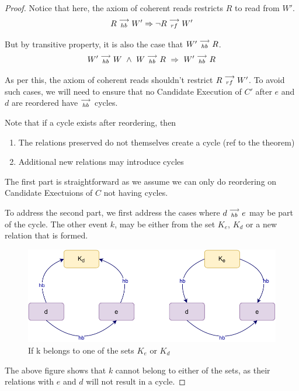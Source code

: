 \begin{proof}
        Notice that here, the axiom of coherent reads restricts $R$ to read from $W'$.
        \[
            R\stackrel{\longrightarrow}{_{hb}}W' \Rightarrow \neg R\stackrel{\longrightarrow}{_{rf}}W'
        \]
        
        But by transitive property, it is also the case that $W'\stackrel{\longrightarrow}{_{hb}}R$. 
        \[
            \reln{W'}{hb}{W} \ \wedge \ \reln{W}{hb}{R} \ 
            \Rightarrow \ 
            \reln{W'}{hb}{R}
        \]
        
        As per this, the axiom of coherent reads shouldn't restrict $R\stackrel{\longrightarrow}{_{rf}}W'$. To avoid such cases, we will need to ensure that no Candidate Execution of $C'$ after $e$ and $d$ are reordered have $\stackrel{\longrightarrow}{_{hb}}$ cycles.
        
        Note that if a cycle exists after reordering, then 
        \begin{enumerate}
            \item The relations preserved do not themselves create a cycle (ref to the theorem)
            \item Additional new relations may introduce cycles
        \end{enumerate}
       
        The first part is straightforward as we assume we can only do reordering on Candidate Exectuions of $C$ not having cycles. 
        
        To address the second part, we first address the cases where $d\stackrel{\longrightarrow}{_{hb}}e$ may be part of the cycle. The other event $k$, may be either from the set $K_e$, $K_d$ or a new relation that is formed.
        \begin{figure}[H]
            \centering
            \includegraphics[scale=0.7]{Q4(a)_1.pdf}
            \caption{If k belongs to one of the sets $K_e$ or $K_d$}
            \label{fig:my_label}
        \end{figure}
        
        The above figure shows that $k$ cannot belong to either of the sets, as their relations with $e$ and $d$ will not result in a cycle. 
        

\end{proof}
